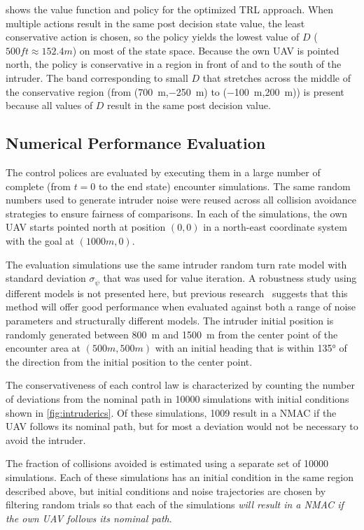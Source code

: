  shows the value function and policy for the optimized TRL approach. 
When multiple actions result in the same post decision state value, the least conservative action is chosen, so the policy yields the lowest value of $D$ ($\num{500} \si{ft} \approx \num{152.4} \si{m}$) on most of the state space. Because the own UAV is pointed north, the policy is conservative in a region in front of and to the south of the intruder. The band corresponding to small $D$ that stretches across the middle of the conservative region (from (\SI{700}{m},\SI{-250}{m}) to (\SI{-100}{m},\SI{200}{m})) is present because all values of $D$ result in the same post decision value.

\subsection{Numerical Performance Evaluation}

The control polices are evaluated by executing them in a large number of complete (from $t=0$ to the end state) encounter simulations. The same random numbers used to generate intruder noise were reused across all collision avoidance  strategies to ensure fairness of comparisons. In each of the simulations, the own UAV starts pointed north at position $(0,0)$ in a north-east coordinate system with the goal at $(1000\si{m},0)$.

The evaluation simulations use the same intruder random turn rate model with standard deviation $\sigma_{\dot{\psi}}$ that was used for value iteration. A robustness study using different models is not presented here, but previous research~\cite{MJK-JPC-PPR:10} suggests that this method will offer good performance when evaluated against both a range of noise parameters and structurally different models. The intruder initial position is randomly generated between \SI{800}{m} and \SI{1500}{m} from the center point of the encounter area at $(500\si{m},500\si{m})$ with an initial heading that is within \ang{135} of the direction from the initial position to the center point. 

The conservativeness of each control law is characterized by counting the number of deviations from the nominal path in \num{10000} simulations with initial conditions shown in \cref{fig:intruderics}.
Of these simulations, \num{1009} result in a NMAC if the UAV follows its nominal path, but for most a deviation would not be necessary to avoid the intruder.

The fraction of collisions avoided is estimated using a separate set of \num{10000} simulations. Each of these simulations has an initial condition in the same region described above, but initial conditions and noise trajectories are chosen by filtering random trials so that each of the simulations \emph{will result in a NMAC if the own UAV follows its nominal path}.

